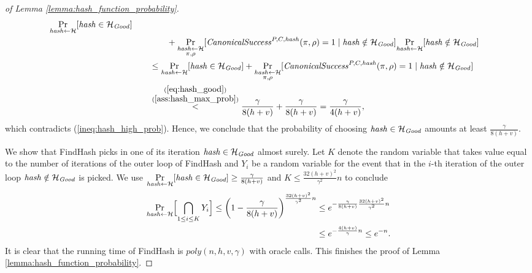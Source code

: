 \begin{proof}[of Lemma \ref{lemma:hash_function_probability}]
\begin{align*}
  \underset{\operatorname{\mathit{hash}} \leftarrow \mathcal{H}}{\Pr}[\operatorname{\mathit{hash}} \in \mathcal{H}_{\mathit{Good}}] \\
  & \mbox\qquad\qquad + \underset{\substack{\operatorname{\mathit{hash}} \leftarrow \mathcal{H} \\ \pi, \rho}}{\Pr}[\operatorname{\mathit{CanonicalSuccess}}^{P,C,\operatorname{\mathit{hash}}}(\pi, \rho) = 1 \mid \operatorname{\mathit{hash}} \notin \mathcal{H}_{\mathit{Good}}]
  \underset{\operatorname{\mathit{hash}} \leftarrow \mathcal{H}}{\Pr}[\operatorname{\mathit{hash}} \notin \mathcal{H}_{\mathit{Good}}] \\
  & \mbox\qquad \leq \underset{\operatorname{\mathit{hash}} \leftarrow \mathcal{H}}{\Pr}[\operatorname{\mathit{hash}} \in \mathcal{H}_{\mathit{Good}}] +
  \underset{\substack{\operatorname{\mathit{hash}} \leftarrow \mathcal{H} \\ \pi, \rho}}{\Pr}[\operatorname{\mathit{CanonicalSuccess}}^{P,C,\operatorname{\mathit{hash}}}(\pi, \rho) = 1 \mid \operatorname{\mathit{hash}} \notin \mathcal{H}_{\mathit{Good}}] \\
  & \mbox\qquad  \stackrel{\substack{ (\ref{eq:hash_good}) \\ (\ref{ass:hash_max_prob})}}{<} \frac{\gamma}{8(h+v)} + \frac{\gamma}{8(h+v)} = \frac{\gamma}{4(h+v)},
\end{align*}
which contradicts (\ref{ineq:hash_high_prob}). Hence, we conclude that the probability of choosing $\operatorname{\mathit{hash}} \in \mathcal{H}_{\mathit{Good}}$ amounts at least $\frac{\gamma}{8(h+v)}$.

We show that FindHash picks in one of its iteration $\operatorname{\mathit{hash}} \in \mathcal{H}_{\mathit{Good}}$ almost surely.
Let $K$ denote the random variable that takes value equal to the number of iterations of
the outer loop of FindHash and $Y_i$ be a random variable for the event
that in the $i$-th iteration of the outer loop $\operatorname{\mathit{hash}} \notin \mathcal{H}_{\mathit{Good}}$ is picked.
We use $\underset{\operatorname{\mathit{hash}} \leftarrow \mathcal{H}}{\Pr}[\operatorname{\mathit{hash}} \in \mathcal{H}_{\textit{Good}}] \geq \frac{\gamma}{8(h+v)}$ and $K \leq \frac{32(h+v)^2}{\gamma^2}n$ to conclude
\begin{align*}
  \underset{\operatorname{\mathit{hash}} \leftarrow \mathcal{H}}{\Pr}\Bigl[ \bigcap_{1 \leq i \leq K} Y_i \Bigr] \leq \left(1 - \frac{\gamma}{8(h+v)}\right)^{\frac{32(h+v)^2}{\gamma^2}n}
    &\leq e^{-\frac{\gamma}{8(h+v)} \frac{32(h+v)^2}{\gamma^2}n} \\
    &\leq e^{-\frac{4(h+v)}{\gamma}n} \leq e^{-n}.
\end{align*}
It is clear that the running time of FindHash is $\mathit{poly}(n,h,v,\gamma)$ with oracle calls.
This finishes the proof of Lemma \ref{lemma:hash_function_probability}.
\end{proof}

